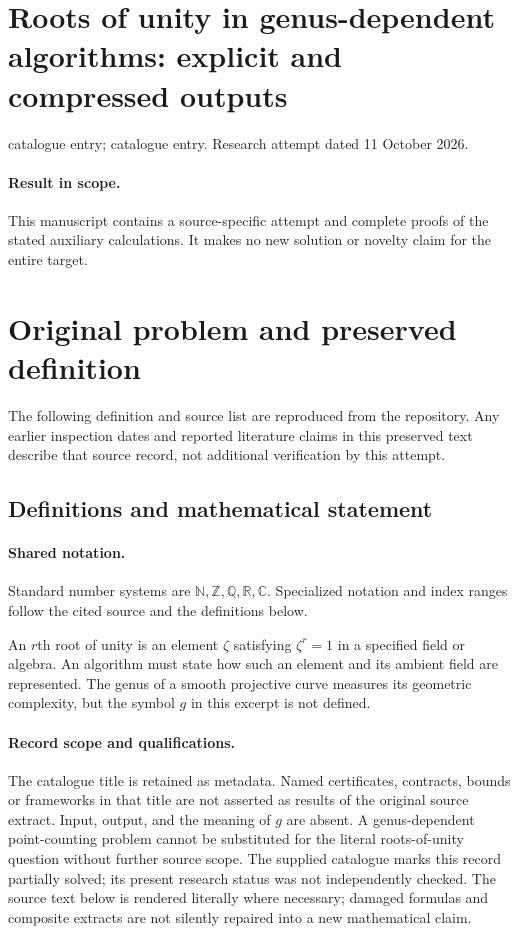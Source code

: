 \documentclass[11pt]{article}
\begin{document}
\section*{Roots of unity in genus-dependent algorithms: explicit and compressed outputs}
\noindent catalogue entry; catalogue entry. Research attempt dated 11 October 2026.
\paragraph{Result in scope.}This manuscript contains a source-specific attempt and complete proofs of the stated auxiliary calculations. It makes no new solution or novelty claim for the entire target.
\section{Original problem and preserved definition}
The following definition and source list are reproduced from the repository. Any earlier inspection dates and reported literature claims in this preserved text describe that source record, not additional verification by this attempt.
\subsection{Definitions and mathematical statement}

\paragraph{Shared notation.}Standard number systems are $\mathbb N,\mathbb Z,\mathbb Q,\mathbb R,\mathbb C$. Specialized notation and index ranges follow the cited source and the definitions below.


An $r$th root of unity is an element $\zeta$ satisfying $\zeta^r=1$ in a specified field or algebra. An algorithm must state how such an element and its ambient field are represented. The genus of a smooth projective curve measures its geometric complexity, but the symbol $g$ in this excerpt is not defined.
\paragraph{Record scope and qualifications.}
The catalogue title is retained as metadata. Named certificates, contracts, bounds or frameworks in that title are not asserted as results of the original source extract.
Input, output, and the meaning of $g$ are absent. A genus-dependent point-counting problem cannot be substituted for the literal roots-of-unity question without further source scope. The supplied catalogue marks this record partially solved; its present research status was not independently checked.
The source text below is rendered literally where necessary; damaged formulas and composite extracts are not silently repaired into a new mathematical claim.
\end{document}
